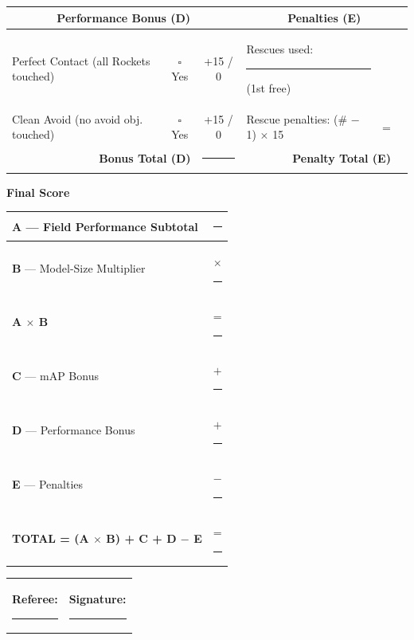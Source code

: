\documentclass[a4paper]{article}
\begin{document}
\vspace{0.5em}

{\small
\begin{tabular}{|p{5.5cm}|c|c||p{4.5cm}|c|c|}
\hline
\multicolumn{3}{|c||}{\textbf{Performance Bonus (D)}} & \multicolumn{3}{c|}{\textbf{Penalties (E)}} \\
\hline
Perfect Contact (all Rockets touched) & $\square$ Yes & +15 / 0 & Rescues used: \rule{1cm}{0.4pt} {\scriptsize (1st free)} & & \\
\hline
Clean Avoid (no avoid obj. touched) & $\square$ Yes & +15 / 0 & Rescue penalties: (\# $-$ 1) $\times$ 15 & = & \\
\hline
\multicolumn{2}{|r|}{\textbf{Bonus Total (D)}} & \rule{1.2cm}{0.4pt} & \multicolumn{2}{r|}{\textbf{Penalty Total (E)}} & \rule{1.2cm}{0.4pt} \\
\hline
\end{tabular}
}

\vspace{0.5em}

{\small \textbf{Final Score}}

\vspace{0.2em}

{\small
\begin{tabular}{|p{6cm}|r|}
\hline
\textbf{A} --- Field Performance Subtotal & \rule{2.5cm}{0.4pt} \\
\hline
\textbf{B} --- Model-Size Multiplier & $\times$ \rule{2cm}{0.4pt} \\
\hline
\textbf{A $\times$ B} & = \rule{2cm}{0.4pt} \\
\hline
\textbf{C} --- mAP Bonus & $+$ \rule{2cm}{0.4pt} \\
\hline
\textbf{D} --- Performance Bonus & $+$ \rule{2cm}{0.4pt} \\
\hline
\textbf{E} --- Penalties & $-$ \rule{2cm}{0.4pt} \\
\hline
\textbf{TOTAL = (A $\times$ B) + C + D $-$ E} & = \rule{2cm}{0.4pt} \\
\hline
\end{tabular}
}

\vspace{0.8em}

\begin{tabular}{p{7cm}p{7cm}}
\textbf{Referee:} \rule{5.5cm}{0.4pt} & \textbf{Signature:} \rule{5.5cm}{0.4pt} \\
\end{tabular}
\end{document}
